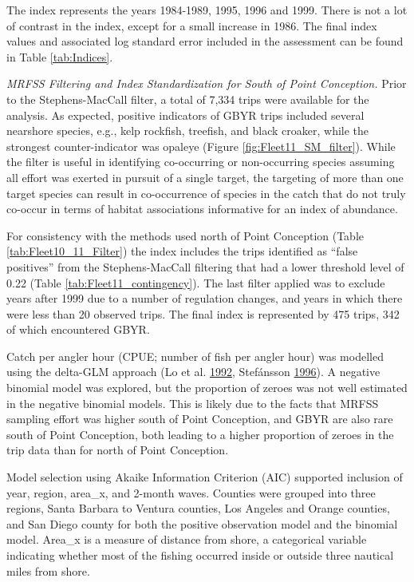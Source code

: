 \documentclass[12pt,]{article}
\begin{document}
The index represents the years 1984-1989, 1995, 1996 and 1999. There is
not a lot of contrast in the index, except for a small increase in 1986.
The final index values and associated log standard error included in the
assessment can be found in Table \ref{tab:Indices}.

\emph{MRFSS Filtering and Index Standardization for South of Point
Conception.} Prior to the Stephens-MacCall filter, a total of 7,334
trips were available for the analysis. As expected, positive indicators
of GBYR trips included several nearshore species, e.g., kelp rockfish,
treefish, and black croaker, while the strongest counter-indicator was
opaleye (Figure \ref{fig:Fleet11_SM_filter}). While the filter is useful
in identifying co-occurring or non-occurring species assuming all effort
was exerted in pursuit of a single target, the targeting of more than
one target species can result in co-occurrence of species in the catch
that do not truly co-occur in terms of habitat associations informative
for an index of abundance.

For consistency with the methods used north of Point Conception (Table
\ref{tab:Fleet10_11_Filter}) the index includes the trips identified as
``false positives'' from the Stephens-MacCall filtering that had a lower
threshold level of 0.22 (Table \ref{tab:Fleet11_contingency}). The last
filter applied was to exclude years after 1999 due to a number of
regulation changes, and years in which there were less than 20 observed
trips. The final index is represented by 475 trips, 342 of which
encountered GBYR.

Catch per angler hour (CPUE; number of fish per angler hour) was
modelled using the delta-GLM approach (Lo et al.
\protect\hyperlink{ref-Lo1992}{1992}, Stefánsson
\protect\hyperlink{ref-Stefansson1996}{1996}). A negative binomial model
was explored, but the proportion of zeroes was not well estimated in the
negative binomial models. This is likely due to the facts that MRFSS
sampling effort was higher south of Point Conception, and GBYR are also
rare south of Point Conception, both leading to a higher proportion of
zeroes in the trip data than for north of Point Conception.

Model selection using Akaike Information Criterion (AIC) supported
inclusion of year, region, area\_x, and 2-month waves. Counties were
grouped into three regions, Santa Barbara to Ventura counties, Los
Angeles and Orange counties, and San Diego county for both the positive
observation model and the binomial model. Area\_x is a measure of
distance from shore, a categorical variable indicating whether most of
the fishing occurred inside or outside three nautical miles from shore.
\end{document}
